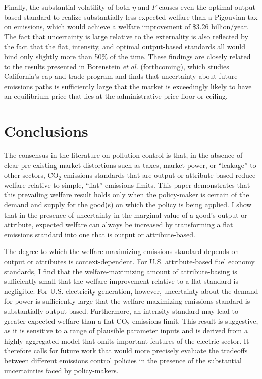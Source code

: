 \documentclass[12pt]{article}
\begin{document}
Finally, the substantial volatility of both $\eta$ and $F$ causes even the optimal output-based standard to realize substantially less expected welfare than a Pigouvian tax on emissions, which would achieve a welfare improvement of \$3.26 billion/year. The fact that uncertainty is large relative to the externality is also reflected by the fact that the flat, intensity, and optimal output-based standards all would bind only slightly more than 50\% of the time. These findings are closely related to the results presented in Borenstein {\it et al.} (forthcoming), which studies California's cap-and-trade program and finds that uncertainty about future emissions paths is sufficiently large that the market is exceedingly likely to have an equilibrium price that lies at the administrative price floor or ceiling.



\section{Conclusions} \label{sec:conclusions}

The consensus in the literature on pollution control is that, in the absence of clear pre-existing market distortions such as taxes, market power, or ``leakage'' to other sectors, CO$_2$ emissions standards that are output or attribute-based reduce welfare relative to simple, ``flat'' emissions limits. This paper demonstrates that this prevailing welfare result holds only when the policy-maker is certain of the demand and supply for the good(s) on which the policy is being applied. I show that in the presence of uncertainty in the marginal value of a good's output or attribute, expected welfare can always be increased by transforming a flat emissions standard into one that is output or attribute-based.

The degree to which the welfare-maximizing emissions standard depends on output or attributes is context-dependent. For U.S. attribute-based fuel economy standards, I find that the welfare-maximizing amount of attribute-basing is sufficiently small that the welfare improvement relative to a flat standard is negligible. For U.S. electricity generation, however, uncertainty about the demand for power is sufficiently large that the welfare-maximizing emissions standard is substantially output-based. Furthermore, an intensity standard may lead to greater expected welfare than a flat CO$_2$ emissions limit. This result is suggestive, as it is sensitive to a range of plausible parameter inputs and is derived from a highly aggregated model that omits important features of the electric sector. It therefore calls for future work that would more precisely evaluate the tradeoffs between different emissions control policies in the presence of the substantial uncertainties faced by policy-makers.
\end{document}

